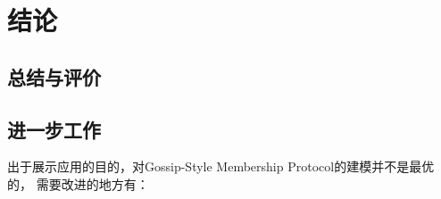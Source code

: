 \chapter{结论}


\section{总结与评价}

\section{进一步工作}

出于展示应用的目的，对Gossip-Style Membership Protocol的建模并不是最优的，
需要改进的地方有：